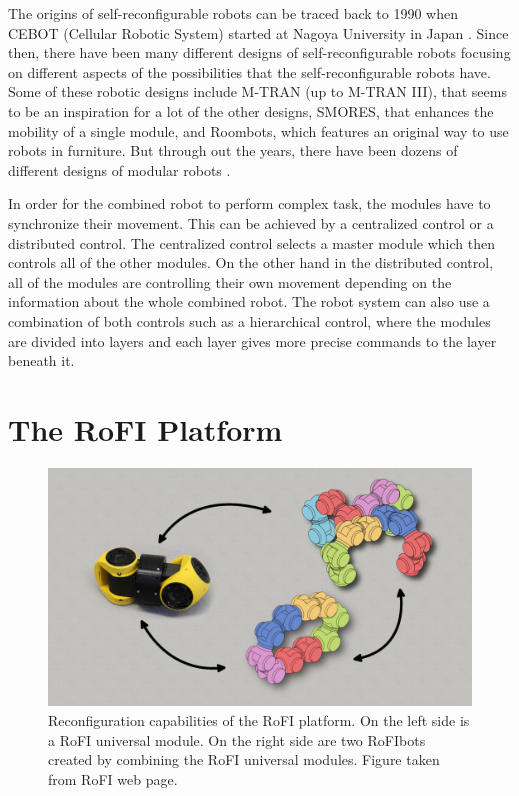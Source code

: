 \documentclass[
  digital, %
  table,   %
  oneside, %
  nolof,     %
  nolot,     %
]{fithesis3}
\begin{document}
The origins of self-reconfigurable robots can be traced back to 1990 when CEBOT (Cellular Robotic System) started at Nagoya University in Japan \cite{current-trends}.
Since then, there have been many different designs of self-reconfigurable robots focusing on different aspects of the possibilities that the self-reconfigurable robots have.
Some of these robotic designs include M-TRAN (up to M-TRAN III)\cite{mtran}, that seems to be an inspiration for a lot of the other designs, SMORES\cite{smores}, that enhances the mobility of a single module, and Roombots\cite{roombots}, which features an original way to use robots in furniture.
But through out the years, there have been dozens of different designs of modular robots \cite{current-trends}.

In order for the combined robot to perform complex task, the modules have to synchronize their movement.
This can be achieved by a centralized control or a distributed control.
The centralized control selects a master module which then controls all of the other modules.
On the other hand in the distributed control, all of the modules are controlling their own movement depending on the information about the whole combined robot.
The robot system can also use a combination of both controls such as a hierarchical control, where the modules are divided into layers and each layer gives more precise commands to the layer beneath it.


\chapter{The RoFI Platform}

\begin{figure}
    \centering
    \includegraphics[width=\linewidth]{data/rofi_transformation.jpg}
    \caption{Reconfiguration capabilities of the RoFI platform. On the left side is a RoFI universal module. On the right side are two RoFIbots created by combining the RoFI universal modules. Figure taken from RoFI web page\cite{rofi-web}.}
    \label{fig:rofi-transform}
\end{figure}
\end{document}
